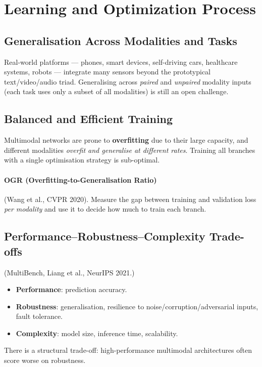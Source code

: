 \documentclass[11pt,a4paper]{article}
\theoremstyle{definition}
\theoremstyle{plain}
\theoremstyle{remark}
\begin{document}
\section{Learning and Optimization Process}

\subsection{Generalisation Across Modalities and Tasks}

Real-world platforms --- phones, smart devices, self-driving cars, healthcare systems, robots --- integrate many sensors beyond the prototypical text/video/audio triad. Generalising across \emph{paired} and \emph{unpaired} modality inputs (each task uses only a subset of all modalities) is still an open challenge.

\subsection{Balanced and Efficient Training}

Multimodal networks are prone to \textbf{overfitting} due to their large capacity, and different modalities \emph{overfit and generalise at different rates}. Training all branches with a single optimisation strategy is sub-optimal.

\paragraph{OGR (Overfitting-to-Generalisation Ratio)} (Wang et al., CVPR 2020). Measure the gap between training and validation loss \emph{per modality} and use it to decide how much to train each branch.

\subsection{Performance--Robustness--Complexity Trade-offs}

(MultiBench, Liang et al., NeurIPS 2021.)
\begin{itemize}
    \item \textbf{Performance}: prediction accuracy.
    \item \textbf{Robustness}: generalisation, resilience to noise/corruption/adversarial inputs, fault tolerance.
    \item \textbf{Complexity}: model size, inference time, scalability.
\end{itemize}
There is a structural trade-off: high-performance multimodal architectures often score worse on robustness.
\end{document}
